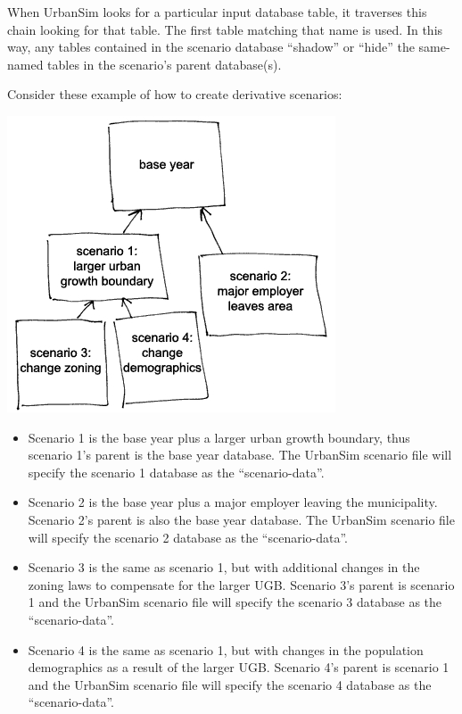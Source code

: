 When UrbanSim looks for a particular input database table, it traverses this
chain looking for that table.  The first table matching that name is used.  In
this way, any tables contained in the scenario database ``shadow'' or ``hide''
the same-named tables in the scenario's parent database(s).

Consider these example of how to create derivative scenarios:\\

\begin{center}
\includegraphics*{scenarios}
\end{center}

\begin{itemize}
\item Scenario 1 is the base year plus a larger urban growth boundary, thus
scenario 1's parent is the base year database. The UrbanSim scenario file will
specify the scenario 1 database as the ``scenario-data''.
\item Scenario 2 is the base year plus a major employer leaving the
municipality. Scenario 2's parent is also the base year database. The UrbanSim
scenario file will specify the scenario 2 database as the ``scenario-data''.
\item Scenario 3 is the same as scenario 1, but with additional changes in the
zoning laws to compensate for the larger UGB. Scenario 3's parent is scenario 1
and the UrbanSim scenario file will specify the scenario 3 database as the
``scenario-data''.
\item Scenario 4 is the same as scenario 1, but with changes in the population
demographics as a result of the larger UGB. Scenario 4's parent is scenario 1
and the UrbanSim scenario file will specify the scenario 4 database as the
``scenario-data''.
\end{itemize}

